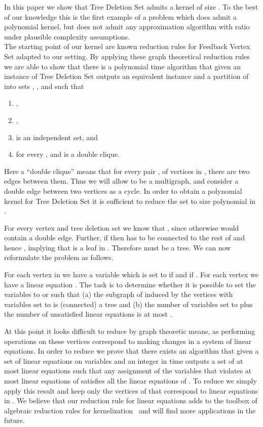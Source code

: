 \documentclass[a4paper,11pt]{article}
\begin{document}
In this paper we show that  {\sc Tree Deletion Set} admits a kernel of size . To the best of our knowledge this is the first example of a problem which does admit a polynomial kernel, but does not admit any approximation algorithm with ratio  under plausible complexity assumptions.\\

The starting point of our kernel are known reduction rules for {\sc Feedback Vertex Set} adapted to our setting. By applying these graph theoretical reduction rules we are able to show that there is a polynomial time algorithm that given 
an instance  of {\sc Tree Deletion Set} outputs an equivalent instance  and a partition of  into sets , , and  such that 
\begin{enumerate}\setlength\itemsep{-.7mm}
\item\label{introlem:clse1} , 
\item\label{introlem:clse2} , 
\item\label{introlem:clse3}  is an independent set, and 
\item\label{introlem:clse4} for every ,  and  is a double clique.
\end{enumerate}

\noindent Here a ``double clique'' means that for every pair ,  of vertices in , there are two edges between them. Thus we will allow  to be a multigraph, and consider a double edge between two vertices as a cycle. In order to obtain a polynomial kernel for {\sc Tree Deletion Set} it is sufficient to reduce the set  to size polynomial in .

For every vertex  and tree deletion set  we know that , since otherwise  would contain a double edge. Further, if  then  has to be connected to the rest of 
 and hence  , implying that  is a leaf in . Therefore  must be a tree. We can now reformulate the problem as follows.

For each vertex  in  we have a variable  which is set to  if  and  if . For each vertex  we have a linear equation . The task is to determine whether it is possible to set the variables to  or  such that (a) the subgraph of  induced by the vertices with variables set to  is (connected) a  tree   and (b) the number of variables set to  plus the number of unsatisfied linear equations is at most .

At this point it looks difficult to reduce  by graph theoretic means, as performing operations on these vertices correspond to making changes in a system of linear equations. In order to reduce  we prove that there exists an algorithm that given a set  of linear equations on  variables and an integer  in time  outputs a set  of at most  linear equations such that any assignment of the variables that violates at most  linear equations of  satisfies all the linear equations of . To reduce  we simply apply this result and keep only the vertices of  that correspond to linear equations in . We believe that our reduction rule for linear equations adds to the toolbox of algebraic reduction rules for kernelization~\cite{KratschW12soda,KratschW12,Wahlstrom13} and will find more applications in the future.
\end{document}
